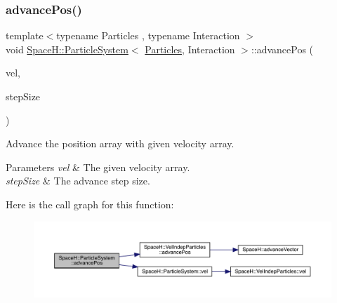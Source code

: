 \subsubsection{\texorpdfstring{advance\+Pos()}{advancePos()}\hspace{0.1cm}{\footnotesize\ttfamily [2/2]}}
{\footnotesize\ttfamily template$<$typename Particles , typename Interaction $>$ \\
void \mbox{\hyperlink{class_space_h_1_1_particle_system}{Space\+H\+::\+Particle\+System}}$<$ \mbox{\hyperlink{struct_space_h_1_1_particles}{Particles}}, Interaction $>$\+::advance\+Pos (\begin{DoxyParamCaption}\item[{const \mbox{\hyperlink{class_space_h_1_1_particle_system_acf48c66c8d42b85cd3a77911bb7da9ce}{Vector\+Array}} \&}]{vel,  }\item[{\mbox{\hyperlink{class_space_h_1_1_particle_system_a522770dcfaf8b29aed35ea9348185a34}{Scalar}}}]{step\+Size }\end{DoxyParamCaption})\hspace{0.3cm}{\ttfamily [inline]}}



Advance the position array with given velocity array. 


\begin{DoxyParams}{Parameters}
{\em vel} & The given velocity array. \\
\hline
{\em step\+Size} & The advance step size. \\
\hline
\end{DoxyParams}
Here is the call graph for this function\+:
\nopagebreak
\begin{figure}[H]
\begin{center}
\leavevmode
\includegraphics[width=350pt]{class_space_h_1_1_particle_system_a9d29a47e00ceed6b77b5e0fec5b967f2_cgraph}
\end{center}
\end{figure}
\mbox{\label{class_space_h_1_1_particle_system_a60555ca2ed3ad323e736b5c810d93ad5}} 
